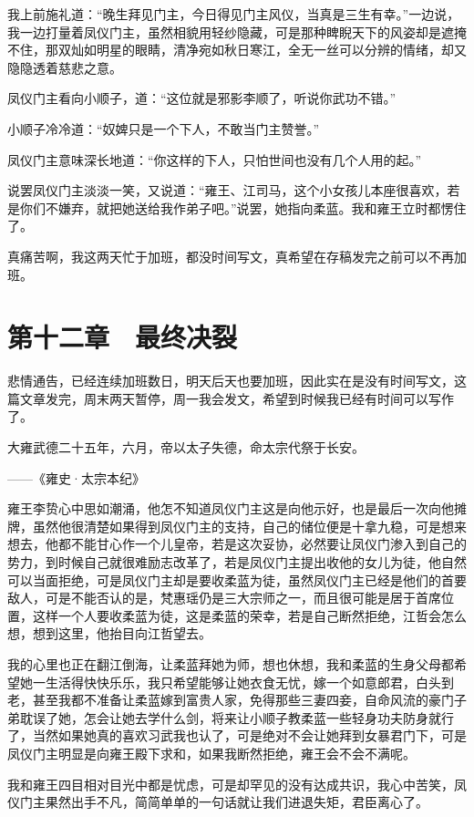 我上前施礼道：“晚生拜见门主，今日得见门主风仪，当真是三生有幸。”一边说，我一边打量着凤仪门主，虽然相貌用轻纱隐藏，可是那种睥睨天下的风姿却是遮掩不住，那双灿如明星的眼睛，清净宛如秋日寒江，全无一丝可以分辨的情绪，却又隐隐透着慈悲之意。

凤仪门主看向小顺子，道：“这位就是邪影李顺了，听说你武功不错。”

小顺子冷冷道：“奴婢只是一个下人，不敢当门主赞誉。”

凤仪门主意味深长地道：“你这样的下人，只怕世间也没有几个人用的起。”

说罢凤仪门主淡淡一笑，又说道：“雍王、江司马，这个小女孩儿本座很喜欢，若是你们不嫌弃，就把她送给我作弟子吧。”说罢，她指向柔蓝。我和雍王立时都愣住了。

真痛苦啊，我这两天忙于加班，都没时间写文，真希望在存稿发完之前可以不再加班。

\chapter{第十二章　最终决裂}

悲情通告，已经连续加班数日，明天后天也要加班，因此实在是没有时间写文，这篇文章发完，周末两天暂停，周一我会发文，希望到时候我已经有时间可以写作了。

大雍武德二十五年，六月，帝以太子失德，命太宗代祭于长安。

——《雍史·太宗本纪》

雍王李贽心中思如潮涌，他怎不知道凤仪门主这是向他示好，也是最后一次向他摊牌，虽然他很清楚如果得到凤仪门主的支持，自己的储位便是十拿九稳，可是想来想去，他都不能甘心作一个儿皇帝，若是这次妥协，必然要让凤仪门渗入到自己的势力，到时候自己就很难励志改革了，若是凤仪门主提出收他的女儿为徒，他自然可以当面拒绝，可是凤仪门主却是要收柔蓝为徒，虽然凤仪门主已经是他们的首要敌人，可是不能否认的是，梵惠瑶仍是三大宗师之一，而且很可能是居于首席位置，这样一个人要收柔蓝为徒，这是柔蓝的荣幸，若是自己断然拒绝，江哲会怎么想，想到这里，他抬目向江哲望去。

我的心里也正在翻江倒海，让柔蓝拜她为师，想也休想，我和柔蓝的生身父母都希望她一生活得快快乐乐，我只希望能够让她衣食无忧，嫁一个如意郎君，白头到老，甚至我都不准备让柔蓝嫁到富贵人家，免得那些三妻四妾，自命风流的豪门子弟耽误了她，怎会让她去学什么剑，将来让小顺子教柔蓝一些轻身功夫防身就行了，当然如果她真的喜欢习武我也认了，可是绝对不会让她拜到女暴君门下，可是凤仪门主明显是向雍王殿下求和，如果我断然拒绝，雍王会不会不满呢。

我和雍王四目相对目光中都是忧虑，可是却罕见的没有达成共识，我心中苦笑，凤仪门主果然出手不凡，简简单单的一句话就让我们进退失矩，君臣离心了。

